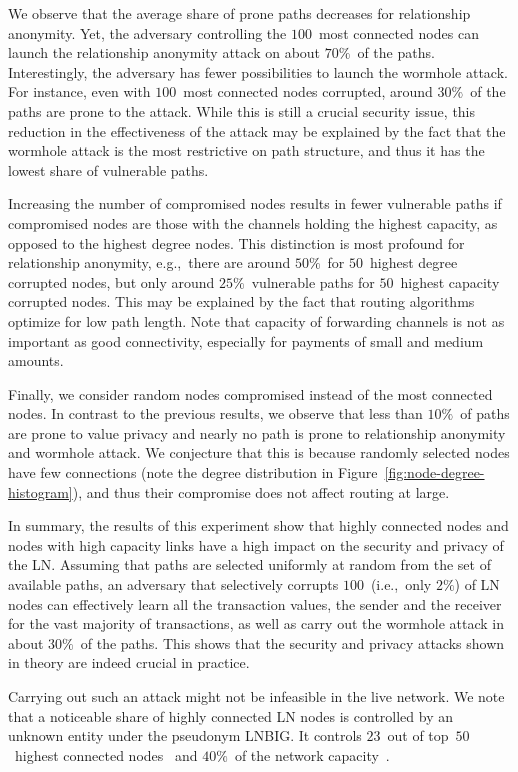 We observe that the average share of prone paths decreases for relationship anonymity.
Yet, the adversary controlling the $100$~most connected nodes can launch the relationship anonymity attack on about $70\%$~of the paths.
Interestingly, the adversary has fewer possibilities to launch the wormhole attack.
For instance, even with $100$~most connected nodes corrupted, around $30\%$~of the paths are prone to the attack.
While this is still a crucial security issue, this reduction in the effectiveness of the attack may be explained by the fact that the wormhole attack is the most restrictive on path structure, and thus it has the lowest share of vulnerable paths.

Increasing the number of compromised nodes results in fewer vulnerable paths if compromised nodes are those with the channels holding the highest capacity, as opposed to the highest degree nodes.
This distinction is most profound for relationship anonymity, e.g.,~there are around $50\%$~for $50$~highest degree corrupted nodes, but only around $25\%$~vulnerable paths for $50$~highest capacity corrupted nodes.
This may be explained by the fact that routing algorithms optimize for low path length.
Note that capacity of forwarding channels is not as important as good connectivity, especially for payments of small and medium amounts.

Finally, we consider random nodes compromised instead of the most connected nodes.
In contrast to the previous results, we observe that less than $10\%$~of paths are prone to value privacy and nearly no path is prone 
to relationship anonymity and wormhole attack.
We conjecture that this is because randomly selected nodes have few connections (note the degree distribution in Figure~\ref{fig:node-degree-histogram}), and thus their compromise does not affect routing at large.

In summary, the results of this experiment show that highly connected nodes and nodes with high capacity links have a high impact on the security and privacy of the LN.
Assuming that paths are selected uniformly at random from the set of available paths, an adversary that selectively corrupts $100$~(i.e.,~only $2\%$) of LN nodes can effectively learn all the transaction values, the sender and the receiver for the vast majority of transactions, as well as carry out the wormhole attack in about $30\%$~of the paths.
This shows that the security and privacy attacks shown in theory are indeed crucial in practice.

Carrying out such an attack might not be infeasible in the live network.
We note that a noticeable share of highly connected LN nodes is controlled by an unknown entity under the pseudonym LNBIG.
It controls $23$~out of top~$50$~highest connected nodes~\cite{1MLTopConnected} and $40\%$~of the network capacity~\cite{TheBlockLNBIG}.


